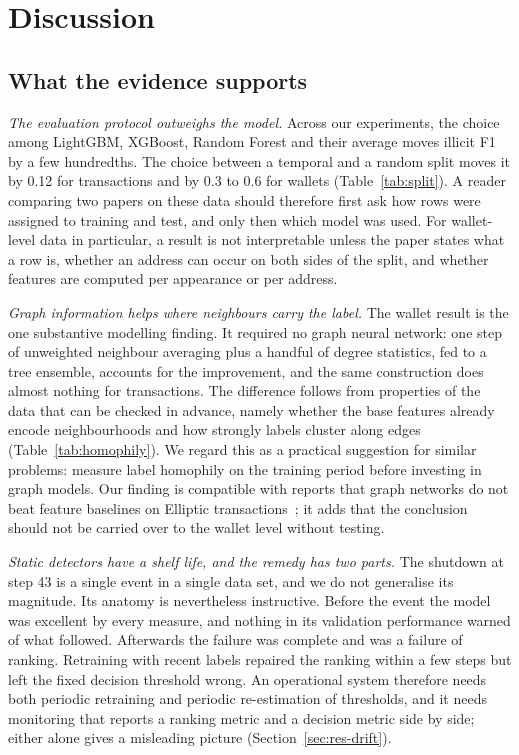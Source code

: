 \section{Discussion}\label{sec:discussion}

\subsection{What the evidence supports}
\emph{The evaluation protocol outweighs the model.} Across our experiments, the choice among LightGBM, XGBoost, Random Forest and their average moves illicit F1 by a few hundredths. The choice between a temporal and a random split moves it by 0.12 for transactions and by 0.3 to 0.6 for wallets (Table~\ref{tab:split}). A reader comparing two papers on these data should therefore first ask how rows were assigned to training and test, and only then which model was used. For wallet-level data in particular, a result is not interpretable unless the paper states what a row is, whether an address can occur on both sides of the split, and whether features are computed per appearance or per address.

\emph{Graph information helps where neighbours carry the label.} The wallet result is the one substantive modelling finding. It required no graph neural network: one step of unweighted neighbour averaging plus a handful of degree statistics, fed to a tree ensemble, accounts for the improvement, and the same construction does almost nothing for transactions. The difference follows from properties of the data that can be checked in advance, namely whether the base features already encode neighbourhoods and how strongly labels cluster along edges (Table~\ref{tab:homophily}). We regard this as a practical suggestion for similar problems: measure label homophily on the training period before investing in graph models. Our finding is compatible with reports that graph networks do not beat feature baselines on Elliptic transactions~\cite{weber2019,maganti2026}; it adds that the conclusion should not be carried over to the wallet level without testing.

\emph{Static detectors have a shelf life, and the remedy has two parts.} The shutdown at step 43 is a single event in a single data set, and we do not generalise its magnitude. Its anatomy is nevertheless instructive. Before the event the model was excellent by every measure, and nothing in its validation performance warned of what followed. Afterwards the failure was complete and was a failure of ranking. Retraining with recent labels repaired the ranking within a few steps but left the fixed decision threshold wrong. An operational system therefore needs both periodic retraining and periodic re-estimation of thresholds, and it needs monitoring that reports a ranking metric and a decision metric side by side; either alone gives a misleading picture (Section~\ref{sec:res-drift}).


